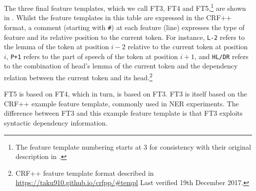 \documentclass[output=paper
,modfonts
,nonflat]{langsci/langscibook}
\begin{document}
The three final feature templates, which we call FT3, FT4 and FT5,\footnote{The feature template numbering starts at 3 for consistency with their original description in \cite{maldonado2017}.} are shown in . Whilst the feature templates in this table are expressed in the CRF++ format, a comment (starting with \texttt{\#}) at each feature (line) expresses the type of feature and its relative position to the current token. For instance, \texttt{L-2} refers to the lemma of the token at position $i-2$ relative to the current token at position~$i$, \texttt{P+1} refers to the part of speech of the token at position $i+1$, and \texttt{HL/DR} refers to the combination of head's lemma of the current token and the dependency relation between the current token and its head.\footnote{CRF++ feature template format described in \url{https://taku910.github.io/crfpp/\#templ} Last verified 19th December 2017.}

FT5 is based on FT4, which in turn, is based on FT3. FT3 is itself based on the CRF++ example feature template, commonly used in NER experiments. The difference between FT3 and this example feature template is that FT3 exploits syntactic dependency information. 
\end{document}
